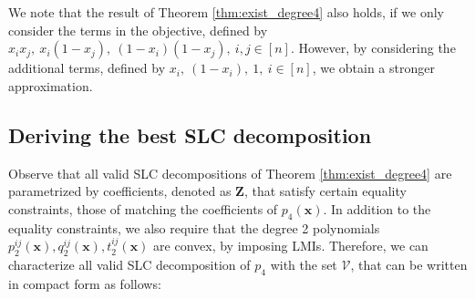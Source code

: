 \documentclass[opre,nonblindrev]{informs3} %
\begin{document}
\begin{remark}
    We note that the result of Theorem \ref{thm:exist_degree4} also holds, if we only consider the terms in the objective, defined by $x_ix_j, \: x_i(1-x_j), \: (1-x_i)(1-x_j), \: i,j \in [n]$. However, by considering the additional terms, defined by $x_i, \: (1-x_i),\: 1, \: i \in [n]$, we obtain a stronger approximation.
\end{remark}

\subsection{Deriving the best SLC decomposition}
Observe that all valid SLC decompositions of Theorem \ref{thm:exist_degree4} are parametrized by coefficients, denoted as $\boldsymbol{Z}$, that satisfy certain equality  constraints, those of matching the coefficients of $p_4(\boldsymbol{x})$. In addition to the equality constraints, we also require that the degree 2 polynomials $p_2^{ij}(\boldsymbol{x}),q_2^{ij}(\boldsymbol{x}),t_2^{ij}(\boldsymbol{x})$ are convex, by imposing LMIs. Therefore, we can characterize all valid SLC decomposition of $p_4$ with the set $\mathcal{V}$, that can be written in compact form as follows:  
\end{document}
